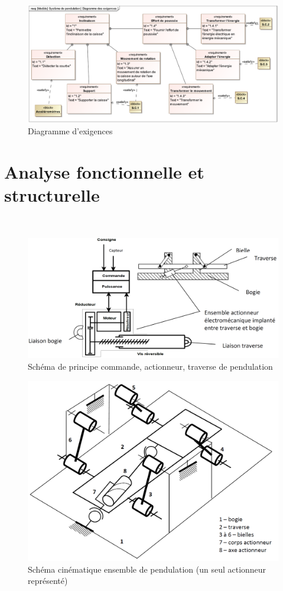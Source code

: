\begin{figure}[!h]
 \centering\includegraphics[width=\linewidth]{img/diagramme_exigences}
 \caption{Diagramme d'exigences}
 \label{exigences}
\end{figure}

\newpage

\section{Analyse fonctionnelle et structurelle}

~\

\begin{figure}[!h]
 \centering\includegraphics[width=0.7\linewidth]{img/fig3}
 \caption{Schéma de principe commande, actionneur, traverse de pendulation}
 \label{img03}
\end{figure}


\begin{figure}[!h]
 \centering\includegraphics[width=0.7\linewidth]{img/fig4}
 \caption{Schéma cinématique ensemble de pendulation (un seul actionneur représenté)}
 \label{img04}
\end{figure}

